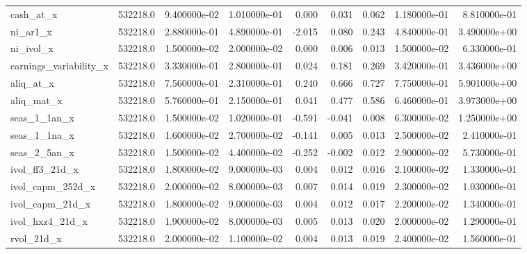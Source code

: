 \documentclass[12pt]{article}
\begin{document}
{\begin{landscape}
\begin{longtable}{|l|r|r|r|r|r|r|r|r|}
cash\_at\_x              &  532218.0 &  9.400000e-02 &  1.010000e-01 &       0.000 &        0.031 &        0.062 &  1.180000e-01 &  8.810000e-01 \\
ni\_ar1\_x               &  532218.0 &  2.880000e-01 &  4.890000e-01 &      -2.015 &        0.080 &        0.243 &  4.840000e-01 &  3.490000e+00 \\
ni\_ivol\_x              &  532218.0 &  1.500000e-02 &  2.000000e-02 &       0.000 &        0.006 &        0.013 &  1.500000e-02 &  6.330000e-01 \\
earnings\_variability\_x &  532218.0 &  3.330000e-01 &  2.800000e-01 &       0.024 &        0.181 &        0.269 &  3.420000e-01 &  3.436000e+00 \\
aliq\_at\_x              &  532218.0 &  7.560000e-01 &  2.310000e-01 &       0.240 &        0.666 &        0.727 &  7.750000e-01 &  5.901000e+00 \\
aliq\_mat\_x             &  532218.0 &  5.760000e-01 &  2.150000e-01 &       0.041 &        0.477 &        0.586 &  6.460000e-01 &  3.973000e+00 \\
seas\_1\_1an\_x           &  532218.0 &  1.500000e-02 &  1.020000e-01 &      -0.591 &       -0.041 &        0.008 &  6.300000e-02 &  1.250000e+00 \\
seas\_1\_1na\_x           &  532218.0 &  1.600000e-02 &  2.700000e-02 &      -0.141 &        0.005 &        0.013 &  2.500000e-02 &  2.410000e-01 \\
seas\_2\_5an\_x           &  532218.0 &  1.500000e-02 &  4.400000e-02 &      -0.252 &       -0.002 &        0.012 &  2.900000e-02 &  5.730000e-01 \\
ivol\_ff3\_21d\_x         &  532218.0 &  1.800000e-02 &  9.000000e-03 &       0.004 &        0.012 &        0.016 &  2.100000e-02 &  1.330000e-01 \\
ivol\_capm\_252d\_x       &  532218.0 &  2.000000e-02 &  8.000000e-03 &       0.007 &        0.014 &        0.019 &  2.300000e-02 &  1.030000e-01 \\
ivol\_capm\_21d\_x        &  532218.0 &  1.800000e-02 &  9.000000e-03 &       0.004 &        0.012 &        0.017 &  2.200000e-02 &  1.340000e-01 \\
ivol\_hxz4\_21d\_x        &  532218.0 &  1.900000e-02 &  8.000000e-03 &       0.005 &        0.013 &        0.020 &  2.000000e-02 &  1.290000e-01 \\
rvol\_21d\_x             &  532218.0 &  2.000000e-02 &  1.100000e-02 &       0.004 &        0.013 &        0.019 &  2.400000e-02 &  1.560000e-01 \\

\end{longtable}
\end{landscape}}
\end{document}
